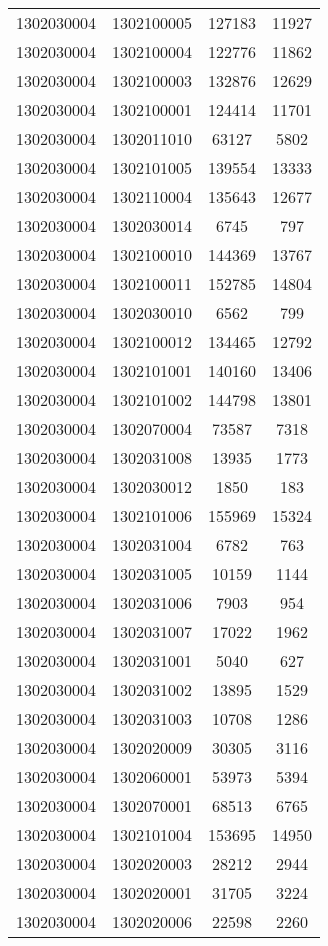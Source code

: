 \begin{longtable}[h]{llcc}
		1302030004 & 1302100005 & 127183 & 11927\\
		1302030004 & 1302100004 & 122776 & 11862\\
		1302030004 & 1302100003 & 132876 & 12629\\
		1302030004 & 1302100001 & 124414 & 11701\\
		1302030004 & 1302011010 & 63127 & 5802\\
		1302030004 & 1302101005 & 139554 & 13333\\
		1302030004 & 1302110004 & 135643 & 12677\\
		1302030004 & 1302030014 & 6745 & 797\\
		1302030004 & 1302100010 & 144369 & 13767\\
		1302030004 & 1302100011 & 152785 & 14804\\
		1302030004 & 1302030010 & 6562 & 799\\
		1302030004 & 1302100012 & 134465 & 12792\\
		1302030004 & 1302101001 & 140160 & 13406\\
		1302030004 & 1302101002 & 144798 & 13801\\
		1302030004 & 1302070004 & 73587 & 7318\\
		1302030004 & 1302031008 & 13935 & 1773\\
		1302030004 & 1302030012 & 1850 & 183\\
		1302030004 & 1302101006 & 155969 & 15324\\
		1302030004 & 1302031004 & 6782 & 763\\
		1302030004 & 1302031005 & 10159 & 1144\\
		1302030004 & 1302031006 & 7903 & 954\\
		1302030004 & 1302031007 & 17022 & 1962\\
		1302030004 & 1302031001 & 5040 & 627\\
		1302030004 & 1302031002 & 13895 & 1529\\
		1302030004 & 1302031003 & 10708 & 1286\\
		1302030004 & 1302020009 & 30305 & 3116\\
		1302030004 & 1302060001 & 53973 & 5394\\
		1302030004 & 1302070001 & 68513 & 6765\\
		1302030004 & 1302101004 & 153695 & 14950\\
		1302030004 & 1302020003 & 28212 & 2944\\
		1302030004 & 1302020001 & 31705 & 3224\\
		1302030004 & 1302020006 & 22598 & 2260\\

\end{longtable}
